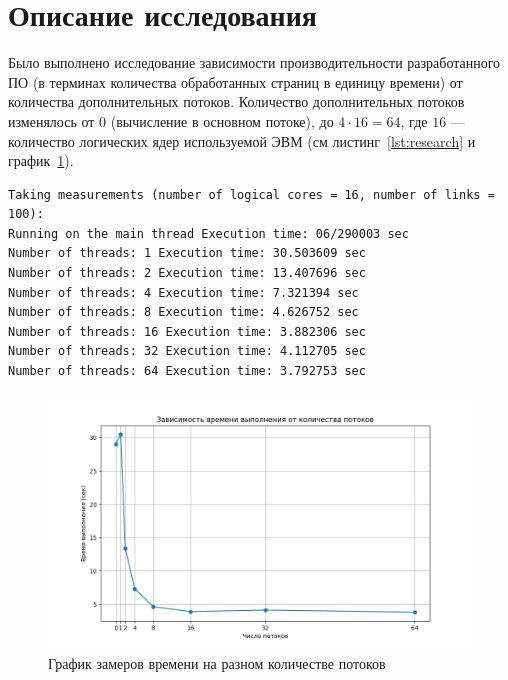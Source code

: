 \section{Описание исследования}

\hspace{1.25cm}
Было выполнено исследование зависимости производительности разработанного ПО (в терминах количества обработанных страниц в единицу времени) от количества дополнительных потоков. Количество дополнительных потоков изменялось от 0 (вычисление в основном потоке), до $4\cdot 16 = 64$, где $16$ --- количество логических ядер используемой ЭВМ (см листинг~\ref{lst:research} и график~\ref{fig:img_graph}).

\vspace{0.25cm}
\begin{lstlisting}[caption=Результаты замеров времени на разном количестве потоков, label=lst:research]
Taking measurements (number of logical cores = 16, number of links = 100):
Running on the main thread Execution time: 06/290003 sec
Number of threads: 1 Execution time: 30.503609 sec
Number of threads: 2 Execution time: 13.407696 sec
Number of threads: 4 Execution time: 7.321394 sec
Number of threads: 8 Execution time: 4.626752 sec
Number of threads: 16 Execution time: 3.882306 sec
Number of threads: 32 Execution time: 4.112705 sec
Number of threads: 64 Execution time: 3.792753 sec
\end{lstlisting}

\vspace{-0.25cm}
\begin{figure}[h]
    \centering
    \includegraphics[width=\linewidth]{img/graph.png}
    \caption{График замеров времени на разном количестве потоков}
    \label{fig:img_graph}
\end{figure}

